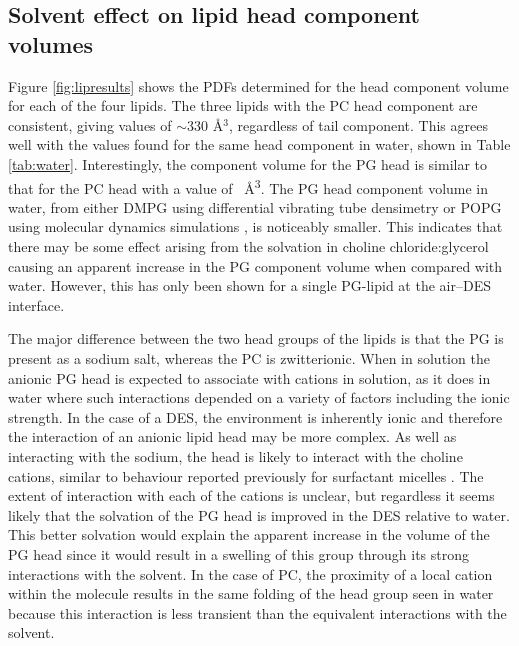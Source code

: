 \documentclass[amsmath,amssymb,twocolumn,superscriptaddress]{revtex4-1}
\begin{document}
\subsection{Solvent effect on lipid head component volumes}
%
Figure \ref{fig:lipresults} shows the PDFs determined for the head component volume for each of the four lipids.
The three lipids with the PC head component are consistent, giving values of $\sim330$ \AA$^3$, regardless of tail component.
This agrees well with the values found for the same head component in water, shown in Table \ref{tab:water}.
Interestingly, the component volume for the PG head is similar to that for the PC head with a value of ~\si{\angstrom\cubed}.
The PG head component volume in water, from either DMPG using differential vibrating tube densimetry \cite{pan_molecular_2012} or POPG using molecular dynamics simulations \cite{kucerka_scattering_2012}, is noticeably smaller.
This indicates that there may be some effect arising from the solvation in choline chloride:glycerol causing an apparent increase in the PG component volume when compared with water.
However, this has only been shown for a single PG-lipid at the air–DES interface.

The major difference between the two head groups of the lipids is that the PG is present as a sodium salt, whereas the PC is zwitterionic.
When in solution the anionic PG head is expected to associate with cations in solution, as it does in water \cite{grigoriev_effect_1999} where such interactions depended on a variety of factors including the ionic strength.
In the case of a DES, the environment is inherently ionic and therefore the interaction of an anionic lipid head may be more complex.
As well as interacting with the sodium, the head is likely to interact with the choline cations, similar to behaviour reported previously for surfactant micelles \cite{sanchez-fernandez_counterion_2018}.
The extent of interaction with each of the cations is unclear, but regardless it seems likely that the solvation of the PG head is improved in the DES relative to water.
This better solvation would explain the apparent increase in the volume of the PG head since it would result in a swelling of this group through its strong interactions with the solvent.
In the case of PC, the proximity of a local cation within the molecule results in the same folding of the head group seen in water because this interaction is less transient than the equivalent interactions with the solvent.
\end{document}
